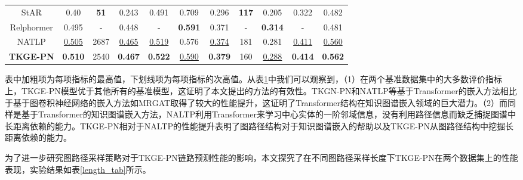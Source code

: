 \begin{table}[htbp]
\begin{center}
\begin{tabular}{*{11}{c}}
            StAR&0.40&\textbf{51}&0.243	&0.491	&0.709	&0.296	&\textbf{117}&	0.205	&0.322	&0.482\\
            Relphormer&0.495&-&0.448&	-	&\textbf{0.591}&	0.371		&-&\textbf{0.314}	&-	&0.481\\
            \cmidrule{1-11}
            NATLP&\underline{0.505}&2687&\underline{0.465}&\underline{0.519}&0.576&\underline{0.374}&181&0.281&\underline{0.411}&\underline{0.560}\\
            \textbf{TKGE-PN}&\textbf{0.510}&2540&\textbf{0.467}	&\textbf{0.522}	&\underline{0.590}	&\textbf{0.379}	&160	&\underline{0.288}	&\textbf{0.414}	&\textbf{0.562}\\
            \bottomrule
        \end{tabular}
        \label{TKGE-PN_result_tab}
    \end{center}
  \end{table}

  表中加粗项为每项指标的最高值，下划线项为每项指标的次高值。从表\ref{TKGE-PN_result_tab}中我们可以观察到，（1）在两个基准数据集中的大多数评价指标上，TKGE-PN模型优于其他所有的基准模型，这证明了本文提出的方法的有效性。TKGN-PN和NATLP等基于Transformer的嵌入方法相比于基于图卷积神经网络的嵌入方法如MRGAT取得了较大的性能提升，这证明了Transformer结构在知识图谱嵌入领域的巨大潜力。（2）而同样是基于Transformer的知识图谱嵌入方法，NALTP利用Transformer来学习中心实体的一阶邻域信息，没有利用路径信息而缺乏捕捉图谱中长距离依赖的能力。TKGE-PN相对于NALTP的性能提升表明了图路径结构对于知识图谱嵌入的帮助以及TKGE-PN从图路径结构中挖掘长距离依赖的能力。

  为了进一步研究图路径采样策略对于TKGE-PN链路预测性能的影响，本文探究了在不同图路径采样长度下TKGE-PN在两个数据集上的性能表现，实验结果如表\ref{length_tab}所示。

